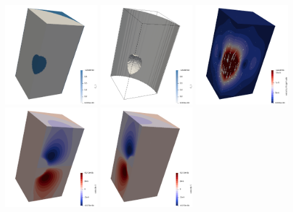 \begin{center}
\includegraphics[width=4cm]{images/stokes_sphere3D/aspect_gr_CYL/C1a}
\includegraphics[width=4cm]{images/stokes_sphere3D/aspect_gr_CYL/C1b}
\includegraphics[width=4cm]{images/stokes_sphere3D/aspect_gr_CYL/vel}\\
\includegraphics[width=4cm]{images/stokes_sphere3D/aspect_gr_CYL/u}
\includegraphics[width=4cm]{images/stokes_sphere3D/aspect_gr_CYL/v}

\end{center}
